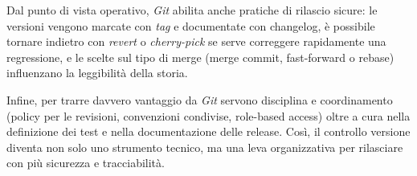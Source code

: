 Dal punto di vista operativo, \emph{Git} abilita anche pratiche di rilascio sicure: le versioni vengono marcate con \emph{tag} e documentate con changelog, è possibile tornare indietro con \emph{revert} o \emph{cherry-pick} se serve correggere rapidamente una regressione, e le scelte sul tipo di merge (merge commit, fast-forward o rebase) influenzano la leggibilità della storia.

Infine, per trarre davvero vantaggio da \emph{Git} servono disciplina e coordinamento (policy per le revisioni, convenzioni condivise, role-based access) oltre a cura nella definizione dei test e nella documentazione delle release. Così, il controllo versione diventa non solo uno strumento tecnico, ma una leva organizzativa per rilasciare con più sicurezza e tracciabilità.








